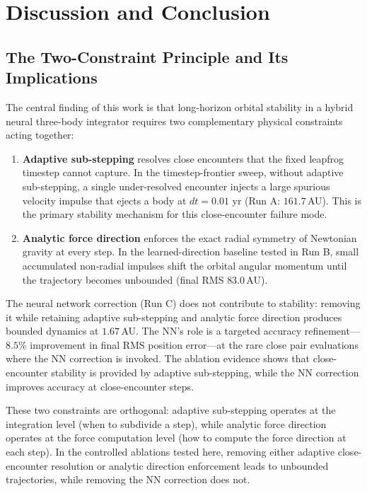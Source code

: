 \documentclass[12pt]{article}
\begin{document}
\section{Discussion and Conclusion}
\label{sec:discussion}

\subsection{The Two-Constraint Principle and Its Implications}

The central finding of this work is that long-horizon orbital stability in a hybrid
neural three-body integrator requires two complementary physical constraints acting
together:

\begin{enumerate}
  \item \textbf{Adaptive sub-stepping} resolves close encounters that the fixed
        leapfrog timestep cannot capture. In the timestep-frontier sweep, without
        adaptive sub-stepping, a single under-resolved encounter injects a large
        spurious velocity impulse that ejects a body at $dt=0.01$ yr
        (Run A: $161.7$\,AU). This is the primary stability mechanism for this
        close-encounter failure mode.
  
  \item \textbf{Analytic force direction} enforces the exact radial symmetry of
        Newtonian gravity at every step. In the learned-direction baseline tested
        in Run B, small accumulated non-radial impulses shift the orbital angular
        momentum until the trajectory becomes unbounded (final RMS $83.0$\,AU).
        
\end{enumerate}

The neural network correction (Run C) does not contribute to stability: removing it
while retaining adaptive sub-stepping and analytic force direction produces bounded
dynamics at $1.67$\,AU. The NN's role is a targeted accuracy refinement---$8.5\%$
improvement in final RMS position error---at the rare close pair evaluations where
the NN correction is invoked. The ablation evidence shows that close-encounter
stability is provided by adaptive sub-stepping, while the NN correction improves
accuracy at close-encounter steps.

These two constraints are orthogonal: adaptive sub-stepping operates at the
integration level (when to subdivide a step), while analytic force direction operates
at the force computation level (how to compute the force direction at each step).
In the controlled ablations tested here, removing either adaptive close-encounter
resolution or analytic direction enforcement leads to unbounded trajectories, while
removing the NN correction does not.
\end{document}
